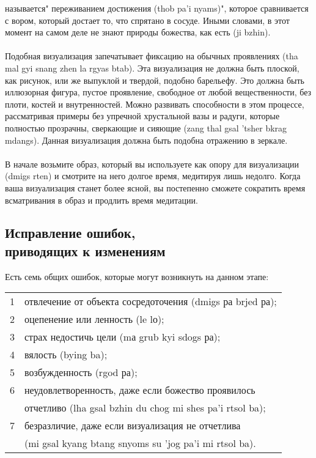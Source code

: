 называется" переживанием достижения (thob pa'i nyams)", которое сравнивается с вором,
который достает то, что спрятано в сосуде. Иными словами, в этот момент на самом деле не
знают природы божества, как есть (ji bzhin).\\
\\
Подобная визуализация запечатывает фиксацию на обычных проявлениях (tha mal gyi
snang zhen la rgyas btab). Эта визуализация не должна быть плоской, как рисунок, или же
выпуклой и твердой, подобно барельефу. Это должна быть иллюзорная фигура, пустое
проявление, свободное от любой вещественности, без плоти, костей и внутренностей. Можно
развивать способности в этом процессе, рассматривая примеры без упречной хрустальной
вазы и радуги, которые полностью прозрачны, сверкающие и сияющие (zang thal gsal 'tsher
bkrag mdangs). Данная визуализация должна быть подобна отражению в зеркале.\\
\\
В начале возьмите образ, который вы используете как опору для визуализации (dmigs
rten) и смотрите на него долгое время, медитируя лишь недолго. Когда ваша визуализация
станет более ясной, вы постепенно сможете сократить время всматривания в образ и
продлить время медитации.\\

\subsection{Исправление ошибок, \\приводящих к изменениям}

Есть семь общих ошибок, которые могут возникнуть на данном этапе:\\

\begin{tabular}{ll}
1 & отвлечение от объекта сосредоточения (dmigs ра brjed ра);\\
2 & оцепенение или ленность (le lо);\\
3 & страх недостичь цели (mа grub kyi sdogs ра);\\
4 & вялость (bying ba);\\
5 & возбужденность (rgod ра);\\
6 & неудовлетворенность, даже если божество проявилось \\
  & отчетливо (lha gsal bzhin du chog mi shes pa'i rtsol ba);\\
7 & безразличие, даже если визуализация не отчетлива \\
  & (mi gsal kyang btang snyoms su 'jog pa'i mi rtsol ba).\\
\end{tabular}

